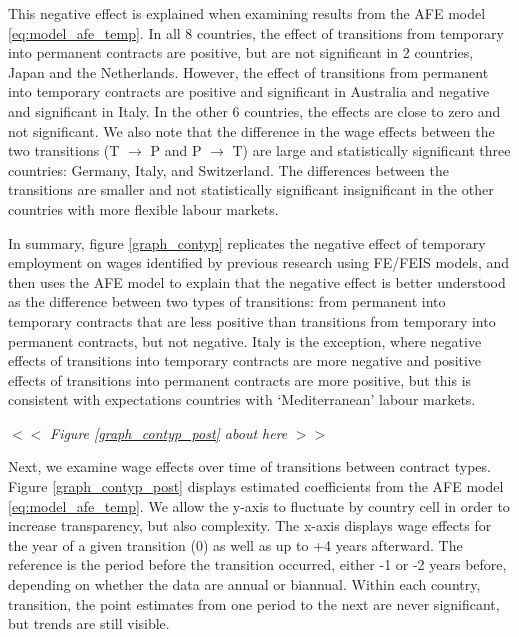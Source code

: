 \documentclass[12pt]{article}
\begin{document}
This negative effect is explained when examining results from the AFE model \ref{eq:model_afe_temp}.  In all 8 countries, the effect of transitions from temporary into permanent contracts are positive, but are not significant in 2 countries, Japan and the Netherlands.  However, the effect of transitions from permanent into temporary contracts are positive and significant in Australia and negative and significant in Italy.  In the other 6 countries, the effects are close to zero and not significant.  We also note that the difference in the wage effects between the two transitions (T $\rightarrow$ P and P $\rightarrow$ T) are large and statistically significant three countries: Germany, Italy, and Switzerland.  The differences between the transitions are smaller and not statistically significant insignificant in the other countries with more flexible labour markets.  

In summary, figure \ref{graph_contyp} replicates the negative effect of temporary employment on wages identified by previous research using FE/FEIS models, and then uses the AFE model to explain that the negative effect is better understood as the difference between two types of transitions: from permanent into temporary contracts that are less positive than transitions from temporary into permanent contracts, but not negative.  Italy is the exception, where negative effects of transitions into temporary contracts are more negative and positive effects of transitions into permanent contracts are more positive, but this is consistent with expectations countries with `Mediterranean' labour markets.

\begin{center}
$<<$ \emph{Figure \ref{graph_contyp_post} about here} $>>$
\end{center}

Next, we examine wage effects over time of transitions between contract types.  Figure \ref{graph_contyp_post} displays estimated coefficients from the AFE model \ref{eq:model_afe_temp}.  We allow the y-axis to fluctuate by country cell in order to increase transparency, but also complexity.  The x-axis displays wage effects for the year of a given transition (0) as well as up to +4 years afterward.  The reference is the period before the transition occurred, either -1 or -2 years before, depending on whether the data are annual or biannual.  Within each country, transition, the point estimates from one period to the next are never significant, but trends are still visible.  
\end{document}

